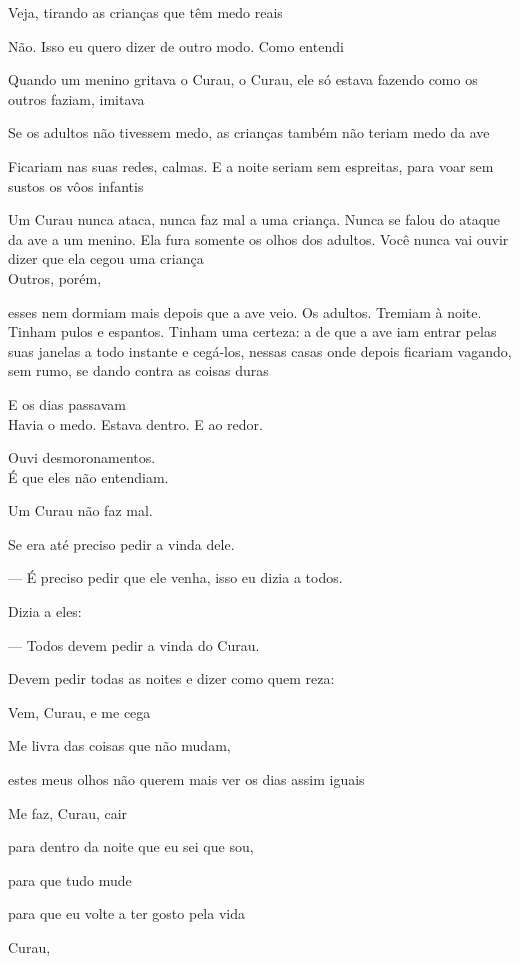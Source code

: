 Veja, tirando as crianças que têm medo reais

Não. Isso eu quero dizer de outro modo. Como entendi

Quando um menino gritava o Curau, o Curau, ele só estava fazendo como os
outros faziam, imitava

Se os adultos não tivessem medo, as crianças também não teriam medo da
ave

Ficariam nas suas redes, calmas. E a noite seriam sem espreitas, para
voar sem sustos os vôos infantis

Um Curau nunca ataca, nunca faz mal a uma criança. Nunca se falou do
ataque da ave a um menino. Ela fura somente os olhos dos adultos. Você
nunca vai ouvir dizer que ela cegou uma criança\\

Outros, porém,

esses nem dormiam mais depois que a ave veio. Os adultos. Tremiam à
noite. Tinham pulos e espantos. Tinham uma certeza: a de que a ave iam
entrar pelas suas janelas a todo instante e cegá-los, nessas casas onde
depois ficariam vagando, sem rumo, se dando contra as coisas duras

E os dias passavam\\

Havia o medo. Estava dentro. E ao redor.

Ouvi desmoronamentos.\\

É que eles não entendiam.

Um Curau não faz mal.

Se era até preciso pedir a vinda dele.

--- É preciso pedir que ele venha, isso eu dizia a todos.

Dizia a eles:

--- Todos devem pedir a vinda do Curau.

Devem pedir todas as noites e dizer como quem reza:

Vem, Curau, e me cega

Me livra das coisas que não mudam,

estes meus olhos não querem mais ver os dias assim iguais

Me faz, Curau, cair

para dentro da noite que eu sei que sou,

para que tudo mude

para que eu volte a ter gosto pela vida

Curau,

